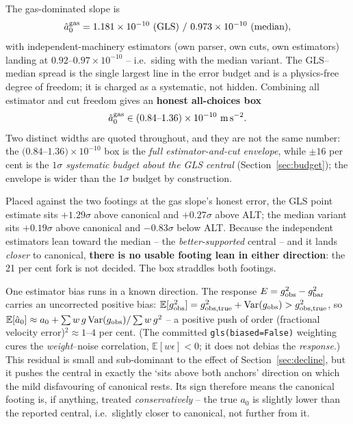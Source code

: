\documentclass[fleqn,usenatbib]{mnras}
\begin{document}
The gas-dominated slope is
\begin{equation}
\hat a_0^{\rm gas}=1.181\times10^{-10}\ (\text{GLS})\ /\ 0.973\times10^{-10}\ (\text{median}),
\label{eq:slope}
\end{equation}
with independent-machinery estimators (own parser, own cuts, own estimators) landing at $0.92$--$0.97\times10^{-10}$ -- i.e.\ siding with the median variant. The GLS--median spread is the single largest line in the error budget and is a physics-free degree of freedom; it is charged as a systematic, not hidden. Combining all estimator and cut freedom gives an \textbf{honest all-choices box}
\begin{equation}
\hat a_0^{\rm gas}\in(0.84\text{--}1.36)\times10^{-10}\ {\rm m\,s^{-2}}.
\label{eq:box}
\end{equation}
Two distinct widths are quoted throughout, and they are not the same number: the $(0.84$--$1.36)\times10^{-10}$ box is the \emph{full estimator-and-cut envelope}, while $\pm16$ per cent is the \emph{$1\sigma$ systematic budget about the GLS central} (Section~\ref{sec:budget}); the envelope is wider than the $1\sigma$ budget by construction.

Placed against the two footings at the gas slope's honest error, the GLS point estimate sits $+1.29\sigma$ above canonical and $+0.27\sigma$ above ALT; the median variant sits $+0.19\sigma$ above canonical and $-0.83\sigma$ below ALT. Because the independent estimators lean toward the median -- the \emph{better-supported} central -- and it lands \emph{closer} to canonical, \textbf{there is no usable footing lean in either direction}: the 21 per cent fork is not decided. The box straddles both footings.

One estimator bias runs in a known direction. The response $E=g_{\rm obs}^2-g_{\rm bar}^2$ carries an uncorrected positive bias: $\mathbb E[g_{\rm obs}^2]=g_{\rm obs,true}^2+{\rm Var}(g_{\rm obs})>g_{\rm obs,true}^2$, so $\mathbb E[\hat a_0]\approx a_0+\sum w\,g\,{\rm Var}(g_{\rm obs})/\sum w\,g^2$ -- a positive push of order (fractional velocity error)$^2\approx1$--$4$ per cent. (The committed \texttt{gls(biased=False)} weighting cures the \emph{weight}--noise correlation, $\mathbb E[w\epsilon]<0$; it does not debias the \emph{response}.) This residual is small and sub-dominant to the effect of Section~\ref{sec:decline}, but it pushes the central in exactly the `sits above both anchors' direction on which the mild disfavouring of canonical rests. Its sign therefore means the canonical footing is, if anything, treated \emph{conservatively} -- the true $a_0$ is slightly lower than the reported central, i.e.\ slightly closer to canonical, not further from it.
\end{document}
